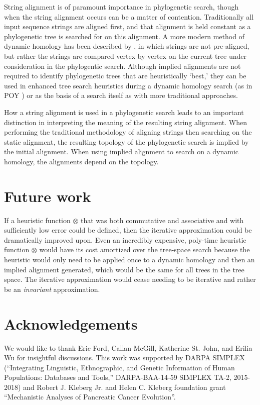 \documentclass[11pt]{article}
\begin{document}
String alignment is of paramount importance in phylogenetic search, though when the string alignment occurs can be a matter of contention.
Traditionally all input sequence strings are aligned first, and that alignment is held constant as a phylogenetic tree is searched for on this alignment.
A more modern method of dynamic homology has been described by \citep{Wheeler1996}, in which strings are not pre-aligned, but rather the strings are compared vertex by vertex on the current tree under consideration in the phylogentic search.
Although implied alignments are not required to identify phylogenetic trees that are heuristically `best,' they can be used in enhanced tree search heuristics during a dynamic homology search (as in POY \citealp{POY5, Wheeleretal2015}) or as the basis of a search itself as with more traditional approaches.

How a string alignment is used in a phylogenetic search leads to an important distinction in interpreting the meaning of the resulting string alignment.
When performing the traditional methodology of aligning strings then searching on the static alignment, the resulting topology of the phylogenetic search is implied by the initial alignment.
When using implied alignment to search on a dynamic homology, the alignments depend on the topology.


\section{Future work}
If a heuristic function $\otimes$ that was both commutative and associative and with sufficiently low error could be defined, then the iterative approximation \citep{Wheeler2003a} could be dramatically improved upon. 
Even an incredibly expensive, poly-time heuristic function $\otimes$ would have its cost amortized over the tree-space search because the heuristic would only need to be applied once to a dynamic homology and then an implied alignment generated, which would be the same for all trees in the tree space. 
The iterative approximation would cease needing to be iterative and rather be an \emph{invariant} approximation.

\section{Acknowledgements}
We would like to thank Eric Ford, Callan McGill, Katherine St. John, and Erilia Wu for insightful discussions. This work was supported by DARPA SIMPLEX (``Integrating Linguistic, Ethnographic, and Genetic Information of Human Populations: Databases and Tools,'' DARPA-BAA-14-59 SIMPLEX TA-2, 2015-2018)
 and Robert J. Kleberg Jr. and Helen C. Kleberg foundation grant ``Mechanistic Analyses of Pancreatic Cancer Evolution''.
\end{document}

